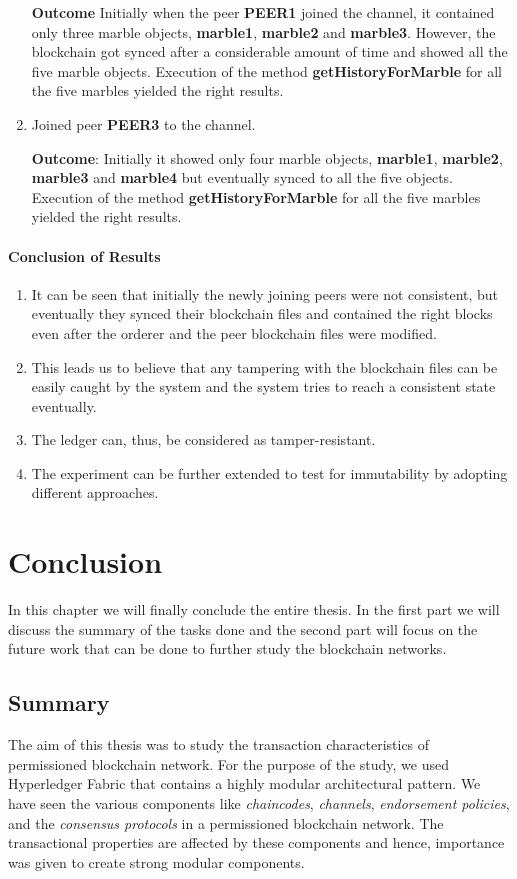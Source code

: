 \documentclass[
  a4paper,  %
  twoside,  %
  bibliography=totoc,
  headsepline,
  cleardoublepage=empty,
  parskip=half,
  draft=false
]{scrbook}
\begin{document}
\begin{enumerate}
    \textbf{Outcome} Initially when the peer \textbf{PEER1} joined the channel, it contained only three marble objects, \textbf{marble1}, \textbf{marble2} and \textbf{marble3}. However, the blockchain got synced after a considerable amount of time and showed all the five marble objects. Execution of the method \textbf{getHistoryForMarble} for all the five marbles yielded the right results.
    \item Joined peer \textbf{PEER3} to the channel.
    
    \textbf{Outcome}: Initially it showed only four marble objects, \textbf{marble1}, \textbf{marble2}, \textbf{marble3} and \textbf{marble4} but eventually synced to all the five objects. Execution of the method \textbf{getHistoryForMarble} for all the five marbles yielded the right results.
\end{enumerate}
\subsubsection{Conclusion of Results}
\begin{enumerate}
    \item It can be seen that initially the newly joining peers were not consistent, but eventually they synced their blockchain files and contained the right blocks even after the orderer and the peer blockchain files were modified.
    \item This leads us to believe that any tampering with the blockchain files can be easily caught by the system and the system tries to reach a consistent state eventually.
    \item The ledger can, thus, be considered as tamper-resistant.
    \item The experiment can be further extended to test for immutability by adopting different approaches.
\end{enumerate}
\chapter{Conclusion}
In this chapter we will finally conclude the entire thesis. In the first part we will discuss the summary of the tasks done and the second part will focus on the future work that can be done to further study the blockchain networks.
\label{chap:cf}

\section*{Summary}
The aim of this thesis was to study the transaction characteristics of permissioned blockchain network. For the purpose of the study, we used Hyperledger Fabric that contains a highly modular architectural pattern. We have seen the various components like \textit{chaincodes}, \textit{channels}, \textit{endorsement policies}, and the \textit{consensus protocols} in a permissioned blockchain network. The transactional properties are affected by these components and hence, importance was given to create strong modular components. 
\end{document}
